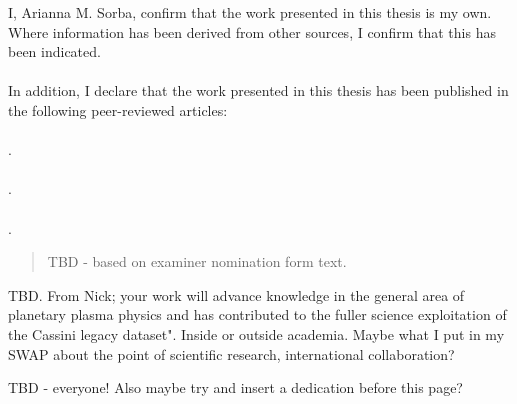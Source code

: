 \maketitle
\begin{declaration}
I, Arianna M. Sorba, confirm that the work presented in this thesis is my own.
Where information has been derived from other sources, I confirm that this has been indicated.
\\
\\
In addition, I declare that the work presented in this thesis has been published in the following peer-reviewed articles:
\\
\\
.
\\
\\
.
\\
\\
.

\end{declaration}
\begin{abstract} %
TBD - based on examiner nomination form text.
\blindtext
\end{abstract}

\begin{impactstatement} %
TBD. From Nick;  your work will advance knowledge in the general area of planetary plasma physics and has contributed to the fuller science exploitation of the Cassini legacy dataset".
Inside or outside academia. Maybe what I put in my SWAP about the point of scientific research, international collaboration?
\blindtext 
\end{impactstatement}

\begin{acknowledgements}
TBD - everyone! Also maybe try and insert a dedication before this page?
\blindtext
\end{acknowledgements}

\setcounter{tocdepth}{2} 

\tableofcontents
\listoffigures
\listoftables

